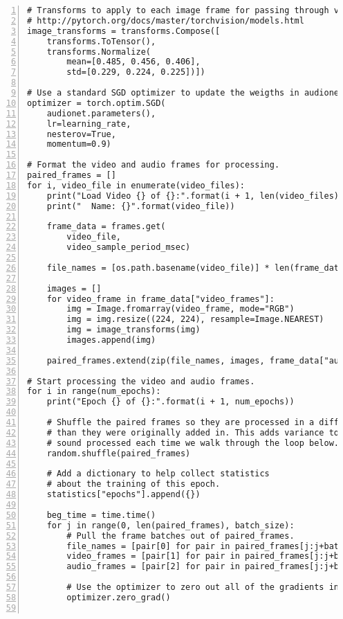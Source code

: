 {\begin{Verbatim}[frame=leftline, numbers=left, xleftmargin=5mm]
# Transforms to apply to each image frame for passing through vgg16.
# http://pytorch.org/docs/master/torchvision/models.html
image_transforms = transforms.Compose([
    transforms.ToTensor(),
    transforms.Normalize(
        mean=[0.485, 0.456, 0.406],
        std=[0.229, 0.224, 0.225])])

# Use a standard SGD optimizer to update the weigths in audionet.
optimizer = torch.optim.SGD(
    audionet.parameters(),
    lr=learning_rate,
    nesterov=True,
    momentum=0.9)

# Format the video and audio frames for processing.
paired_frames = []
for i, video_file in enumerate(video_files):
    print("Load Video {} of {}:".format(i + 1, len(video_files)))
    print("  Name: {}".format(video_file))

    frame_data = frames.get(
        video_file,
        video_sample_period_msec)

    file_names = [os.path.basename(video_file)] * len(frame_data["video_frames"])

    images = []
    for video_frame in frame_data["video_frames"]:
        img = Image.fromarray(video_frame, mode="RGB")
        img = img.resize((224, 224), resample=Image.NEAREST)
        img = image_transforms(img)
        images.append(img)

    paired_frames.extend(zip(file_names, images, frame_data["audio_frames"]))

# Start processing the video and audio frames.
for i in range(num_epochs):
    print("Epoch {} of {}:".format(i + 1, num_epochs))

    # Shuffle the paired frames so they are processed in a different order
    # than they were originally added in. This adds variance to the types of
    # sound processed each time we walk through the loop below.
    random.shuffle(paired_frames)

    # Add a dictionary to help collect statistics
    # about the training of this epoch.
    statistics["epochs"].append({})

    beg_time = time.time()
    for j in range(0, len(paired_frames), batch_size):
        # Pull the frame batches out of paired_frames.
        file_names = [pair[0] for pair in paired_frames[j:j+batch_size]]
        video_frames = [pair[1] for pair in paired_frames[j:j+batch_size]]
        audio_frames = [pair[2] for pair in paired_frames[j:j+batch_size]]

        # Use the optimizer to zero out all of the gradients in audionet.
        optimizer.zero_grad()


\end{Verbatim}}
